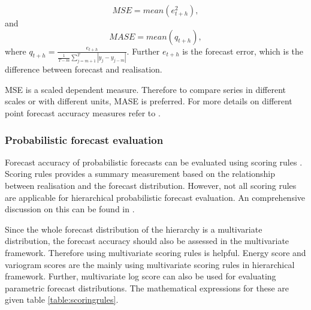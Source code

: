 \documentclass[graybox]{svmult}
\begin{document}
\begin{equation}\label{eq:22}
MSE = mean(e^2_{t+h}),
\end{equation}
and
\begin{equation}\label{eq:23}
MASE = mean(q_{t+h}),
\end{equation}
where $q_{t+h} = \frac{e_{t+h}}{\frac{1}{T-m}\sum_{j=m+1}^{T}|y_j - y_{j-m}|}$. Further $e_{t+h}$ is the forecast error, which is the difference between forecast and realisation.

MSE is a scaled dependent measure. Therefore to compare series in different scales or with different units, MASE is preferred. For more details on different point forecast accuracy measures refer to \cite{hyndman2018forecasting}.

\subsubsection{Probabilistic forecast evaluation}

Forecast accuracy of probabilistic forecasts can be evaluated using scoring rules \cite{Gneiting2014}. Scoring rules provides a summary measurement based on the relationship between realisation and the forecast distribution. However, not all scoring rules are applicable for hierarchical probabilistic forecast evaluation. An comprehensive discussion on this can be found in \cite{Gamakumara2018}.

Since the whole forecast distribution of the hierarchy is a multivariate distribution, the forecast accuracy should also be assessed in the multivariate framework. Therefore using multivariate scoring rules is helpful. Energy score \citep{Gneiting2008} and variogram scores \citep{SCHEUERER2015} are the mainly using multivariate scoring rules in hierarchical framework. Further, multivariate log score \citep{Gneiting2007} can also be used for evaluating parametric forecast distributions. The mathematical expressions for these are given table \ref{table:scoringrules}.
\end{document}
